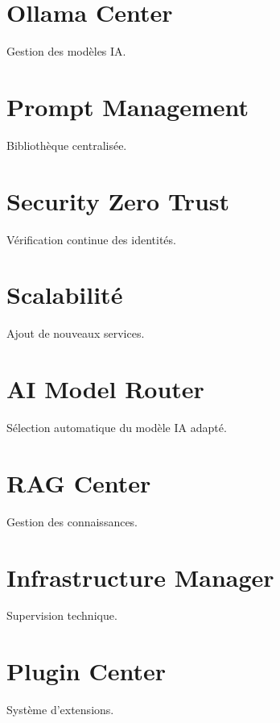 \documentclass[12pt,a4paper,oneside]{book}
\begin{document}
\chapter{Ollama Center}
Gestion des modèles IA.

\chapter{Prompt Management}
Bibliothèque centralisée.

\chapter{Security Zero Trust}
Vérification continue des identités.

\chapter{Scalabilité}
Ajout de nouveaux services.

\chapter{AI Model Router}
Sélection automatique du modèle IA adapté.

\chapter{RAG Center}
Gestion des connaissances.

\chapter{Infrastructure Manager}
Supervision technique.

\chapter{Plugin Center}
Système d'extensions.
\end{document}
